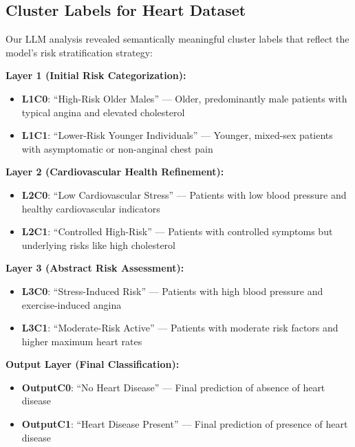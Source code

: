 \subsection{Cluster Labels for Heart Dataset}

Our LLM analysis revealed semantically meaningful cluster labels that reflect the model's risk stratification strategy:

\textbf{Layer 1 (Initial Risk Categorization):}
\begin{itemize}
    \item \textbf{L1C0}: ``High-Risk Older Males'' — Older, predominantly male patients with typical angina and elevated cholesterol
    \item \textbf{L1C1}: ``Lower-Risk Younger Individuals'' — Younger, mixed-sex patients with asymptomatic or non-anginal chest pain
\end{itemize}

\textbf{Layer 2 (Cardiovascular Health Refinement):}
\begin{itemize}
    \item \textbf{L2C0}: ``Low Cardiovascular Stress'' — Patients with low blood pressure and healthy cardiovascular indicators
    \item \textbf{L2C1}: ``Controlled High-Risk'' — Patients with controlled symptoms but underlying risks like high cholesterol
\end{itemize}

\textbf{Layer 3 (Abstract Risk Assessment):}
\begin{itemize}
    \item \textbf{L3C0}: ``Stress-Induced Risk'' — Patients with high blood pressure and exercise-induced angina
    \item \textbf{L3C1}: ``Moderate-Risk Active'' — Patients with moderate risk factors and higher maximum heart rates
\end{itemize}

\textbf{Output Layer (Final Classification):}
\begin{itemize}
    \item \textbf{OutputC0}: ``No Heart Disease'' — Final prediction of absence of heart disease
    \item \textbf{OutputC1}: ``Heart Disease Present'' — Final prediction of presence of heart disease
\end{itemize}